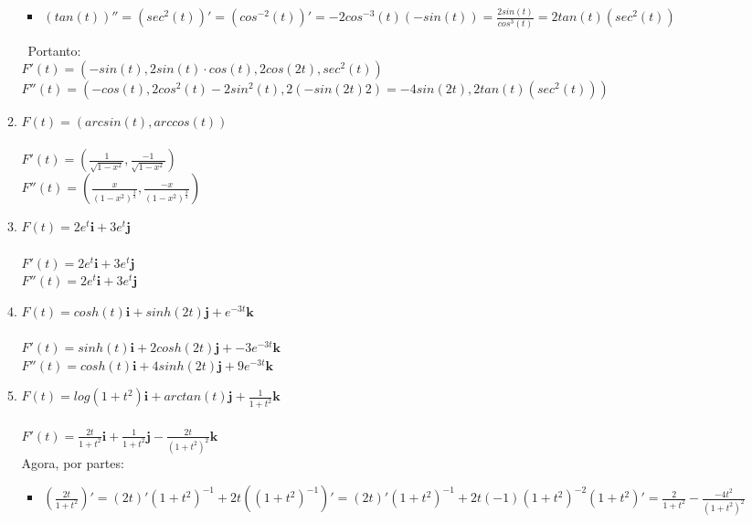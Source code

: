 \documentclass{article}
\begin{document}
\begin{enumerate}
\begin{enumerate}[label=1.\arabic*.]
\begin{itemize}
                    \item $(tan(t))'' = (sec^2(t))' = (cos^{-2}(t))' = -2cos^{-3}(t)(-sin(t)) = \frac{2sin(t)}{cos^3(t)} = 2tan(t)(sec^2(t))$ \
                \end{itemize} \
                Portanto: \\
                $F'(t) = (-sin(t), 2sin(t) \cdot cos(t), 2cos(2t), sec^2(t))$ \\
                $F''(t) = (-cos(t), 2cos^2(t) - 2sin^2(t), 2(-sin(2t)2) = -4sin(2t),  2tan(t)(sec^2(t)))$ \\
            \item $F(t) = (arcsin(t), arccos(t))$ \\
                \\
                $F'(t) = (\frac{1}{\sqrt{1-x^2}}, \frac{-1}{\sqrt{1-x^2}})$ \\
                $F''(t) = (\frac{x}{(1-x^2)^{\frac{3}{2}}}, \frac{-x}{(1-x^2)^{\frac{3}{2}}})$ \\
            \item $F(t) = 2e^t\textbf{i} + 3e^t\textbf{j}$ \\
                \\
                $F'(t) = 2e^t\textbf{i} + 3e^t\textbf{j}$ \\
                $F''(t) = 2e^t\textbf{i} + 3e^t\textbf{j}$\\
            \item $F(t) = cosh(t) \textbf{i} + sinh(2t) \textbf{j} + e^{-3t}\textbf{k}$ \\
                \\
                $F'(t) = sinh(t) \textbf{i} + 2cosh(2t) \textbf{j} + -3e^{-3t} \textbf{k}$ \\ 
                $F''(t) = cosh(t) \textbf{i} + 4sinh(2t) \textbf{j} + 9e^{-3t} \textbf{k} $ \\
            \item $F(t) = log(1+t^2)\textbf{i} + arctan(t) \textbf{j} + \frac{1}{1+t^2}\textbf{k}$ \\
                \\
                $F'(t) = \frac{2t}{1+t^2}\textbf{i} + \frac{1}{1+t^2}\textbf{j} - \frac{2t}{(1+t^2)^2}\textbf{k} $ \\
                Agora, por partes: \
                \begin{itemize}
                    \item $(\frac{2t}{1+t^2})' = (2t)'(1+t^2)^{-1} + 2t((1+t^2)^{-1})' = (2t)'(1+t^2)^{-1} + 2t(-1)(1+t^2)^{-2}(1+t^2)' = \frac{2}{1+t^2} - \frac{-4t^2}{(1+t^2)^2} $ \

\end{itemize}
\end{enumerate}
\end{enumerate}
\end{document}
